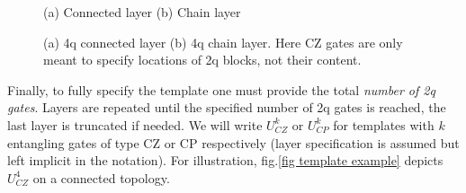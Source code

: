 \documentclass[draft, amsfonts, amssymb, aps, nofootinbib, twocolumn]{revtex4-2}
\newcommand{\CZ}{CZ }
\newcommand{\CP}{CP }
\begin{document}
\begin{figure}
(a)	Connected layer \qquad\qquad(b) Chain layer
\\
\qquad\qquad
{}
\caption{(a) 4q connected layer (b) 4q chain layer. Here CZ gates are only meant to specify locations of 2q blocks, not their content. }
\label{fig layers}
\end{figure}

Finally, to fully specify the template one must provide the total \textit{number of 2q gates}. Layers are repeated until the specified number of 2q gates is reached, the last layer is truncated if needed. We will write $U^k_{CZ}$ or $U^k_{CP}$ for templates with $k$ entangling gates of type \CZ or \CP respectively (layer specification is assumed but left implicit in the notation). For illustration, fig.\ref{fig template example} depicts $U^4_{CZ}$ on a connected topology.
\end{document}
